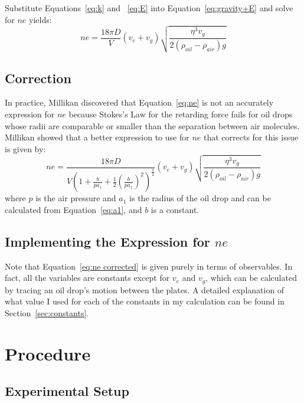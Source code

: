 \documentclass{article}
\begin{document}
Substitute Equations~\ref{eq:k} and ~\ref{eq:E} into Equation~\ref{eq:gravity+E} and solve for $n e$ yields:
\begin{equation} \label{eq:ne}
    n e = \frac{18 \pi D}{V} (v_e + v_g) \sqrt{\frac{\eta^3 v_g}{2 (\rho_{oil} - \rho_{air}) g}}
\end{equation}

\subsection{Correction}
In practice, Millikan discovered that Equation~\ref{eq:ne} is not an accurately expression for $n e$ because Stokes's Law for the retarding force fails for oil drops whose radii are comparable or smaller than the separation between air molecules. Millikan showed that a better expression to use for $n e$ that corrects for this issue is given by:
\begin{equation} \label{eq:ne corrected}
    n e = \frac{18 \pi D}{V (1 + \frac{b}{p a_1} + \frac{1}{2} (\frac{b}{p a_1})^2)^{\frac{3}{2}}} (v_e + v_g) \sqrt{\frac{\eta^3 v_g}{2 (\rho_{oil} - \rho_{air}) g}}
\end{equation}
where $p$ is the air pressure and $a_1$ is the radius of the oil drop and can be calculated from Equation~\ref{eq:a1}, and $b$ is a constant.

\subsection{Implementing the Expression for $n e$}
\label{sec:implement}
Note that Equation~\ref{eq:ne corrected} is given purely in terms of observables. In fact, all the variables are constants except for $v_e$ and $v_g$, which can be calculated by tracing an oil drop's motion between the plates. A detailed explanation of what value I used for each of the constants in my calculation can be found in Section~\ref{sec:constants}.


\section{Procedure}

\subsection{Experimental Setup}
\label{sec: setup}
\end{document}

